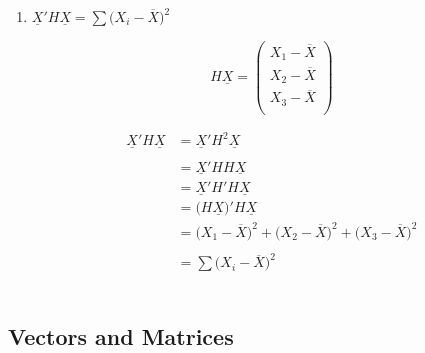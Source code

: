 \documentclass[11pt,a4paper]{article}
\theoremstyle{definition}
\begin{document}
\begin{enumerate}
\item $\underline{X}'H\underline{X} = \sum \big(X_i-\overline{X}\big)^2$

$$H\underline{X} = 
\begin{pmatrix}
X_1 - \overline{X}\\
X_2 - \overline{X}\\
X_3 - \overline{X}\\
\end{pmatrix}
$$

\begin{align*}
\underline{X}'H\underline{X} & = \underline{X}' H^2 \underline{X}\\\\
& = \underline{X}'HH\underline{X}\\
& = \underline{X}'H'H\underline{X}\\
& = \big(H\underline{X}\big)'H\underline{X}\\
& = \big(X_1-\overline{X}\big)^2 + \big(X_2-\overline{X}\big)^2 + \big(X_3-\overline{X}\big)^2\\\\
& = \sum (X_i-\overline{X}\big)^2\\\\\\
\end{align*}
\end{enumerate}







\subsection{Vectors and Matrices}
\end{document}

